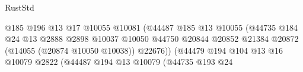 \begin{lexlean}{RustStd}
\begin{coremodule}
                                                          @185
                                                          @196
                                                          @13
                                                          @17
                                                          @10055
                                                          @10081
                                                          (@44487
                                                            @185
                                                            @13
                                                            @10055
                                                            (@44735
                                                              @184
                                                              @24
                                                              @13
                                                              @2888
                                                              @2898
                                                              @10037
                                                              @10050
                                                              @44750
                                                              @20844
                                                              @20852
                                                              @21384
                                                              @20872
                                                              (@14055 (@20874 @10050 @10038))
                                                              @22676))
                                                          (@44479
                                                            @194
                                                            @104
                                                            @13
                                                            @16
                                                            @10079
                                                            @2822
                                                            (@44487
                                                              @194
                                                              @13
                                                              @10079
                                                              (@44735
                                                                @193
                                                                @24

\end{coremodule}
\end{lexlean}
